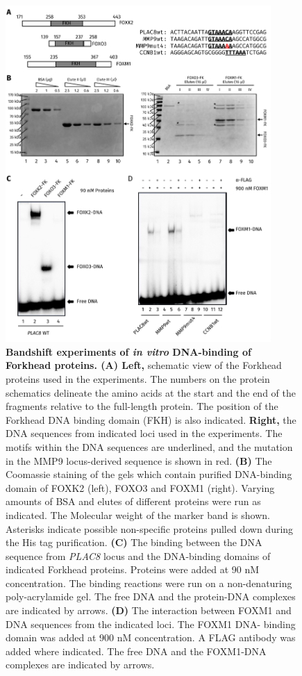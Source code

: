 \begin{figure}[!h]
    \centering
    \includegraphics[width=0.9\textwidth]{chapter3/figures_foxm1/fig24.pdf}
    \caption[Bandshift experiments of \textit{in vitro} DNA-binding of Forkhead proteins]{\textbf{Bandshift experiments of \textit{in vitro} DNA-binding of Forkhead proteins. (A) Left,} schematic view of the Forkhead proteins used in the experiments. The numbers on the protein schematics delineate the amino acids at the start and the end of the fragments relative to the full-length protein. The position of the Forkhead DNA binding domain (FKH) is also indicated. \textbf{Right,} the DNA sequences from indicated loci used in the experiments. The motifs within the DNA sequences are underlined, and the mutation in the MMP9 locus-derived sequence is shown in red. \textbf{(B)} The Coomassie staining of the gels which contain purified DNA-binding domain of FOXK2 (left), FOXO3 and FOXM1 (right). Varying amounts of BSA and elutes of different proteins were run as indicated. The Molecular weight of the marker band is shown. Asterisks indicate possible non-specific proteins pulled down during the His tag purification. \textbf{(C)} The binding between the DNA sequence from \textit{PLAC8} locus and the DNA-binding domains of indicated Forkhead proteins. Proteins were added at 90 nM concentration. The binding reactions were run on a non-denaturing poly-acrylamide gel. The free DNA and the protein-DNA complexes are indicated by arrows. \textbf{(D)} The interaction between FOXM1 and DNA sequences from the indicated loci. The FOXM1 DNA- binding domain was added at 900 nM concentration. A FLAG antibody was added where indicated. The free DNA and the FOXM1-DNA complexes are indicated by arrows.}
    \label{fig:fig24}
\end{figure}

